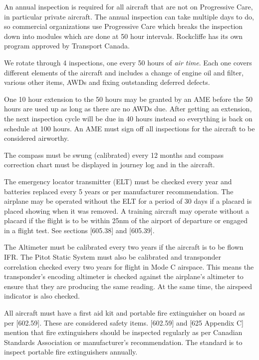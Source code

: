 \documentclass[12pt,letterpaper]{article}
\begin{document}
    An annual inspection is required for all aircraft that are not on Progressive Care, in particular private aircraft. The annual inspection can take multiple days to do, so commercial organizations use Progressive Care which breaks the inspection down into modules which are done at 50 hour intervals. Rockcliffe has its own program approved by Transport Canada.

    We rotate through 4 inspections, one every 50 hours of \emph{air time}. Each one covers different elements of the aircraft and includes a change of engine oil and filter, various other items, AWDs and fixing outstanding deferred defects.
    
    One 10 hour extension to the 50 hours may be granted by an AME before the 50 hours are used up as long as there are no AWDs due. After getting an extension, the next inspection cycle will be due in 40 hours instead so everything is back on schedule at 100 hours. An AME must sign off all inspections for the aircraft to be considered airworthy.

    The compass must be swung (calibrated) every 12 months and compass correction chart must be displayed in journey log and in the aircraft.

    The emergency locator transmitter (ELT) must be checked every year and batteries replaced every 5 years or per manufacturer recommendation. The airplane may be operated without the ELT for a period of 30 days if a placard is placed showing when it was removed. A training aircraft may operate without a placard if the flight is to be within 25nm of the airport of departure or engaged in a flight test. See sections [605.38] and [605.39].

    The Altimeter must be calibrated every two years if the aircraft is to be flown IFR. The Pitot Static System must also be calibrated and transponder correlation checked every two years for flight in Mode C airspace. This means the transponder’s encoding altimeter is checked against the airplane’s altimeter to ensure that they are producing the same reading. At the same time, the airspeed indicator is also checked.
    
    All aircraft must have a first aid kit and portable fire extinguisher on board as per [602.59]. These are considered safety items. [602.59] and [625 Appendix C] mention that fire extinguishers should be inspected regularly as per Canadian Standards Association or manufacturer's recommendation. The standard is to inspect portable fire extinguishers annually.
    
\end{document}
